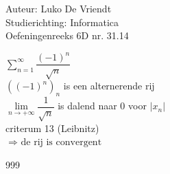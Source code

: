 \documentclass[a4paper]{article}
\begin{document}
\noindent \large Auteur: Luko De Vriendt\\
\noindent \large Studierichting: Informatica\\
\noindent \large Oefeningenreeks 6D nr. 31.14\\

\medskip

\normalsize

$\displaystyle\sum \limits_{n = 1}^{\infty} \dfrac{(-1)^n}{\sqrt{n}}$ \\

$((-1)^n)_n $ is een alternerende rij \\

$\lim \limits_{n \rightarrow +\infty} \dfrac{1}{\sqrt{n}}$ is dalend naar 0 voor $|x_n|$ \\

criterum 13 (Leibnitz) \\

$\Rightarrow \text{ de rij is convergent}$ \\

\begin{thebibliography}{999}
\end{thebibliography}
\end{document}
